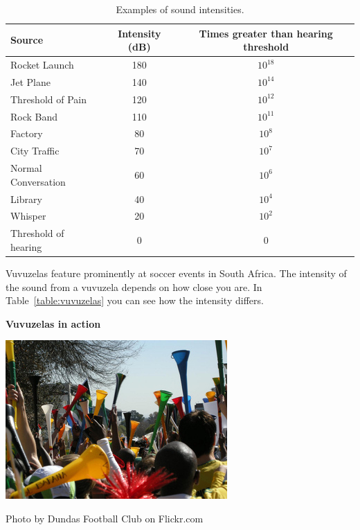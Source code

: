 \begin{table}[H]
\begin{center}
\begin{tabular}{|l|c|c|}\hline
\textbf{Source}&\textbf{Intensity} (dB) & \textbf{Times greater than hearing threshold}\\\hline
Rocket Launch &180 & $10^{18}$\\
Jet Plane & 140 & $10^{14}$ \\
Threshold of Pain & 120 & $10^{12}$\\
Rock Band & 110 & $10^{11}$\\
Factory & 80 & $10^{8}$\\
City Traffic & 70 & $10^{7}$\\
Normal Conversation & 60 & $10^{6}$\\
Library & 40 & $10^{4}$\\
Whisper & 20 & $10^{2}$\\
Threshold of hearing & 0 & 0\\
\hline
\end{tabular}
\end{center}
\caption{Examples of sound intensities.}
\label{p:wsl:s11:intensity}
\end{table}
\begin{minipage}{.5\textwidth}
Vuvuzelas feature prominently at soccer events in South Africa. The intensity of the sound from a vuvuzela depends on how close you are. In Table~\ref{table:vuvuzelas} you can see how the intensity differs.
\end{minipage}
\begin{minipage}{.5\textwidth}
\begin{center}
\textbf{Vuvuzelas in action}\par
\includegraphics[width=.8\textwidth]{photos/vuvuzelas_dundas_football_club.jpg}\par
Photo by Dundas Football Club on Flickr.com
\end{center}
\end{minipage}

